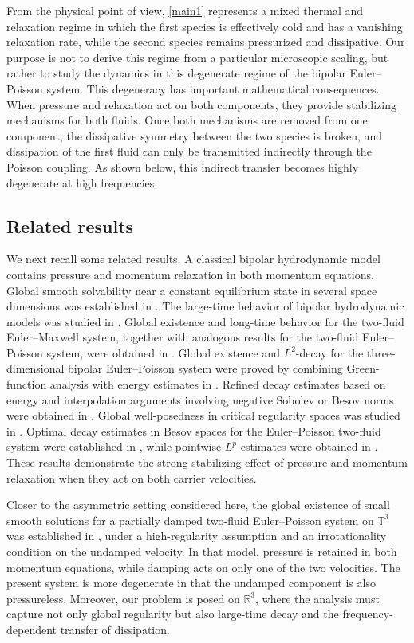 \documentclass[10pt,reqno]{amsart}
\numberwithin{equation}{section}
\begin{document}
From the physical point of view, \eqref{main1} represents a mixed thermal and relaxation regime in which the first species is effectively cold and has a vanishing relaxation rate, while the second species remains pressurized and dissipative. Our purpose is not to derive this regime from a particular microscopic scaling, but rather to study the dynamics in this degenerate regime of the bipolar Euler--Poisson system. This degeneracy has important mathematical consequences. When pressure and relaxation act on both components, they provide stabilizing mechanisms for both fluids. Once both mechanisms are removed from one component, the dissipative symmetry between the two species is broken, and dissipation of the first fluid can only be transmitted indirectly through the Poisson coupling. As shown below, this indirect transfer becomes highly degenerate at high frequencies.


%
%
%
%
%
%
\subsection{Related results}

We next recall some related results. A classical bipolar hydrodynamic model contains pressure and momentum relaxation in both momentum equations. Global smooth solvability near a constant equilibrium state in several space dimensions was established in \cite{AJ03}. The large-time behavior of bipolar hydrodynamic models was studied in \cite{GHL03,HMW11}. Global existence and long-time behavior for the two-fluid Euler--Maxwell system, together with analogous results for the two-fluid Euler--Poisson system, were obtained in \cite{Pen12}. Global existence and $L^2$-decay for the three-dimensional bipolar Euler--Poisson system were proved by combining Green-function analysis with energy estimates in \cite{LY12}. Refined decay estimates based on energy and interpolation arguments involving negative Sobolev or Besov norms were obtained in \cite{WW14}. Global well-posedness in critical regularity spaces was studied in \cite{PX13}. Optimal decay estimates in Besov spaces for the Euler--Poisson two-fluid system were established in \cite{XK15}, while pointwise $L^p$ estimates were obtained in \cite{WL16}. These results demonstrate the strong stabilizing effect of pressure and momentum relaxation when they act on both carrier velocities.

Closer to the asymmetric setting considered here, the global existence of small smooth solutions for a partially damped two-fluid Euler--Poisson system on $\mathbb T^3$ was established in \cite{ZZ19}, under a high-regularity assumption and an irrotationality condition on the undamped velocity. In that model, pressure is retained in both momentum equations, while damping acts on only one of the two velocities. The present system is more degenerate in that the undamped component is also pressureless. Moreover, our problem is posed on $\mathbb R^3$, where the analysis must capture not only global regularity but also large-time decay and the frequency-dependent transfer of dissipation.
\end{document}
